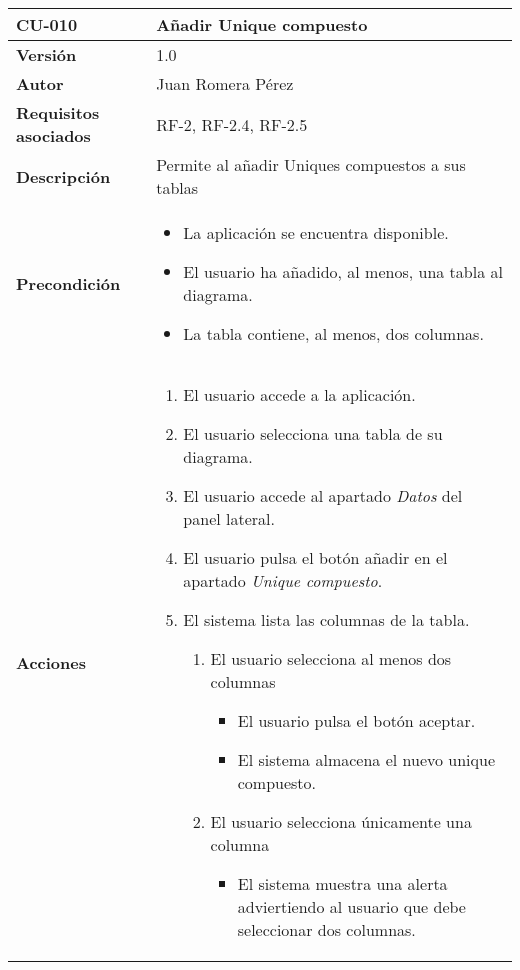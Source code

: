 \begin{table}[p]
    \centering
    \begin{tabularx}{\linewidth}{ p{} p{}}
		\toprule
		\textbf{CU-010}    & \textbf{Añadir Unique compuesto}\\
		\toprule
		\textbf{Versión}              & 1.0    \\
		\textbf{Autor}                & Juan Romera Pérez \\
		\textbf{Requisitos asociados} & RF-2, RF-2.4, RF-2.5 \\
		\textbf{Descripción}          & Permite al añadir Uniques compuestos a sus tablas \\
		\textbf{Precondición}         & \begin{itemize}
		    \item La aplicación se encuentra disponible.
            \item El usuario ha añadido, al menos, una tabla al diagrama.
            \item La tabla contiene, al menos, dos columnas.
		\end{itemize} \\
		\textbf{Acciones}             &
		\begin{enumerate}
			\def\labelenumi{\arabic{enumi}.}
			\tightlist
			\item El usuario accede a la aplicación.
			\item El usuario selecciona una tabla de su diagrama.
            \item El usuario accede al apartado \emph{Datos} del panel lateral.
            \item El usuario pulsa el botón añadir en el apartado \emph{Unique compuesto}.
            \item El sistema lista las columnas de la tabla.
            \begin{enumerate}
                \item El usuario selecciona al menos dos columnas
                \begin{itemize}
                    \item El usuario pulsa el botón aceptar.
                    \item El sistema almacena el nuevo unique compuesto.
                \end{itemize}
                \item El usuario selecciona únicamente una columna
                \begin{itemize}
                    \item El sistema muestra una alerta adviertiendo al usuario que debe seleccionar dos columnas.

\end{itemize}
\end{enumerate}
\end{enumerate}
\end{tabularx}
\end{table}
